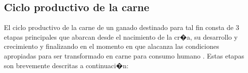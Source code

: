 


\subsection{Ciclo productivo de la carne}
 
El ciclo productivo de la carne de un ganado destinado para tal fin consta de 3 etapas principales que abarcan desde el nacimiento de la cr�a, su desarrollo y crecimiento y finalizando en el momento en que alacanza las condiciones apropiadas para ser transformado en carne para consumo humano \cite{mahecha}. Estas etapas son brevemente descritas a continuaci�n:

